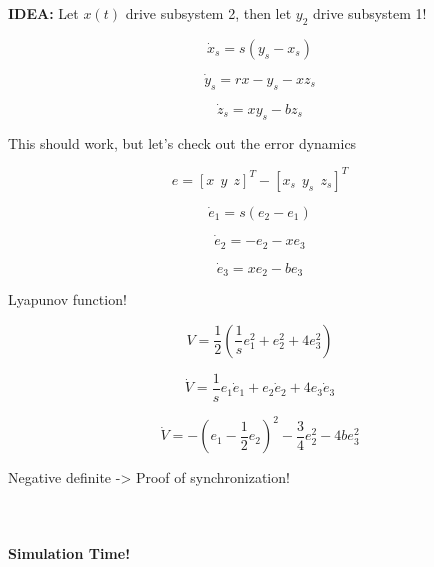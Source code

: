 \documentclass{article}
\begin{document}
$\:$

\textbf{IDEA:} Let $x(t)$ drive subsystem 2, then let $y_2$ drive
subsystem 1!

\begin{equation}
\dot{x}_s = s(y_s - x_s)
\end{equation}

\begin{equation}
\dot{y}_s = rx - y_s - xz_s
\end{equation}

\begin{equation}
\dot{z}_s = xy_s - bz_s
\end{equation}

This should work, but let's check out the error dynamics

\begin{equation}
e = [x \ \ y \ \ z]^T - [x_s \ \ y_s \ \ z_s]^T
\end{equation}

\begin{equation}
\dot{e}_1 = s(e_2 - e_1)
\end{equation}

\begin{equation}
\dot{e}_2 = -e_2 - xe_3
\end{equation}

\begin{equation}
\dot{e}_3 = xe_2 - be_3
\end{equation}

Lyapunov function!

\begin{equation}
V = \frac{1}{2} (\frac{1}{s}e_1^2 + e_2^2 + 4e_3^2)
\end{equation}

\begin{equation}
\dot{V} = \frac{1}{s} e_1 \dot{e}_1 + e_2 \dot{e}_2 + 4 e_3\dot{e}_3
\end{equation}

\begin{equation}
\dot{V} = -(e_1 -\frac{1}{2}e_2)^2 - \frac{3}{4}e_2^2 - 4be_3^2
\end{equation}

Negative definite -\textgreater{} Proof of synchronization!

    $\:$

$\:$

$\:$

\textbf{Simulation Time!}
\end{document}
